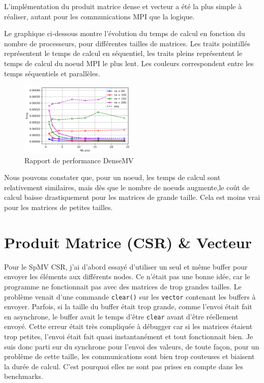 \documentclass[10pt,twocolumn,letterpaper]{article}
\def\code#1{\texttt{#1}}
\begin{document}
L'implémentation du produit matrice dense et vecteur a été la plus simple à réaliser, autant pour les communications MPI que la logique.

Le graphique ci-dessous montre l'évolution du temps de calcul en fonction du nombre de processeurs, pour différentes tailles de matrices.
Les traits pointillés représentent le temps de calcul en séquentiel, les traits pleins représentent le temps de calcul du noeud MPI le plus lent.
Les couleurs correspondent entre les temps séquentiels et parallèles.

\begin{figure}[H]
  \centering
  \caption{Rapport de performance DenseMV}
  \includegraphics[width=0.49\textwidth]{figures/densemv_benchmark.png}
\end{figure}

Nous pouvons constater que, pour un noeud, les temps de calcul sont relativement similaires, 
mais dès que le nombre de noeuds augmente,le coût de calcul baisse drastiquement pour les matrices de grande taille.
Cela est moins vrai pour les matrices de petites tailles.

\section{Produit Matrice (CSR) \& Vecteur}

Pour le SpMV CSR, j'ai d'abord essayé d'utiliser un seul et même buffer pour envoyer les éléments
aux différents nodes. Ce n'était pas une bonne idée, car le programme ne fonctionnait pas avec des matrices de trop grandes tailles.
Le problème venait d'une commande \code{clear()} sur les \code{vector} contenant les buffers à envoyer.
Parfois, si la taille du buffer était trop grande, comme l'envoi était fait en asynchrone, le buffer avait le temps d'être \code{clear} avant d'être réellement envoyé.
Cette erreur était très compliquée à débugger car si les matrices étaient trop petites, l'envoi était fait quasi instantanément et tout fonctionnait bien.
Je suis donc parti sur du synchrone pour l'envoi des valeurs, de toute façon, pour un problème de cette taille, 
les communications sont bien trop couteuses et biaisent la durée de calcul.
C'est pourquoi elles ne sont pas prises en compte dans les benchmarks.
\end{document}
